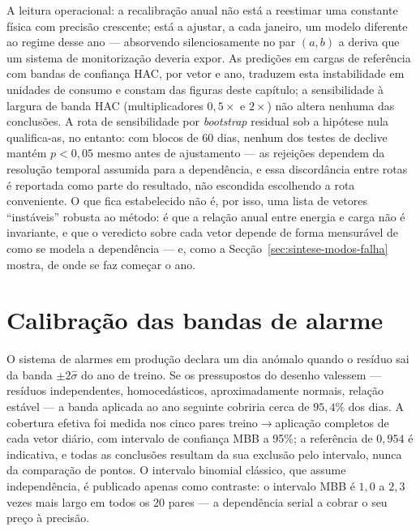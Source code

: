 A leitura operacional: a recalibração anual não está a reestimar uma constante
física com precisão crescente; está a ajustar, a cada janeiro, um modelo
diferente ao regime desse ano --- absorvendo silenciosamente no par $(a, b)$ a
deriva que um sistema de monitorização deveria expor. As predições em cargas
de referência com bandas de confiança HAC, por vetor e ano, traduzem esta
instabilidade em unidades de consumo e constam das figuras deste capítulo;
a sensibilidade à largura de banda HAC (multiplicadores $0{,}5\times$ e
$2\times$) não altera nenhuma das conclusões. A rota de sensibilidade por
\emph{bootstrap} residual sob a hipótese nula qualifica-as, no entanto: com
blocos de 60 dias, nenhum dos testes de declive mantém $p<0{,}05$ mesmo antes
de ajustamento --- as rejeições dependem da resolução temporal assumida para
a dependência, e essa discordância entre rotas é reportada como parte do
resultado, não escondida escolhendo a rota conveniente. O que fica
estabelecido não é, por isso, uma lista de vetores ``instáveis'' robusta ao
método: é que a relação anual entre energia e carga não é invariante, e que
o veredicto sobre cada vetor depende de forma mensurável de como se modela
a dependência --- e, como a Secção~\ref{sec:sintese-modos-falha} mostra, de
onde se faz começar o ano.

\section{Calibração das bandas de alarme}
\label{sec:calibracao}


O sistema de alarmes em produção declara um dia anómalo quando o resíduo sai
da banda $\pm 2\hat\sigma$ do ano de treino. Se os pressupostos do desenho
valessem --- resíduos independentes, homocedásticos, aproximadamente normais,
relação estável --- a banda aplicada ao ano seguinte cobriria cerca de
$95{,}4\%$ dos dias. A cobertura efetiva foi medida nos cinco pares
treino${\to}$aplicação completos de cada vetor diário, com intervalo de
confiança MBB a 95\%; a referência de $0{,}954$ é indicativa, e todas as
conclusões resultam da sua exclusão pelo intervalo, nunca da comparação de
pontos. O intervalo binomial clássico, que assume independência, é publicado
apenas como contraste: o intervalo MBB é $1{,}0$ a $2{,}3$ vezes mais largo em
todos os 20 pares --- a dependência serial a cobrar o seu preço à precisão.

